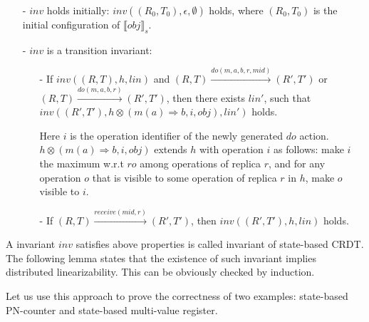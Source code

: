 \begin{itemize}
\setlength{\itemsep}{0.5pt}
\item[-] $\mathit{inv}$ holds initially: $\mathit{inv}((R_0,T_0),\epsilon,\emptyset)$ holds, where $(R_0, T_0)$ is the initial configuration of $\llbracket \mathit{obj} \rrbracket_s$. 

\item[-] $\mathit{inv}$ is a transition invariant: 

    \begin{itemize}
    \setlength{\itemsep}{0.5pt}
    \item[-] If $\mathit{inv}((R, T),h,\mathit{lin})$ and $(R, T) {\xrightarrow{\mathit{do}(m,a,b,r,\mathit{mid})}} (R', T')$ or $(R, T) {\xrightarrow{\mathit{do}(m,a,b,r)}} (R', T')$, then there exists $\mathit{lin}'$, such that $\mathit{inv}((R', T'), h \otimes (m(a) \Rightarrow b, i, \mathit{obj}), \mathit{lin}')$ holds.
        
        Here $i$ is the operation identifier of the newly generated $\mathit{do}$ action. $h \otimes (m(a) \Rightarrow b,i,\mathit{obj})$ extends $h$ with operation $i$ as follows: make $i$ the maximum w.r.t $\mathit{ro}$ among operations of replica $r$, and for any operation $o$ that is visible to some operation of replica $r$ in $h$, make $o$ visible to $i$.
    
    \item[-] If $(R, T) {\xrightarrow{\mathit{receive}(\mathit{mid},r)}} (R', T')$, then $\mathit{inv}((R', T'),h,\mathit{lin})$ holds. 
    \end{itemize}
\end{itemize} 

A invariant $\mathit{inv}$ satisfies above properties is called invariant of state-based CRDT. The following lemma states that the existence of such invariant implies distributed linearizability. This can be obviously checked by induction. 

Let us use this approach to prove the correctness of two examples: state-based PN-counter and state-based multi-value register. 





 



